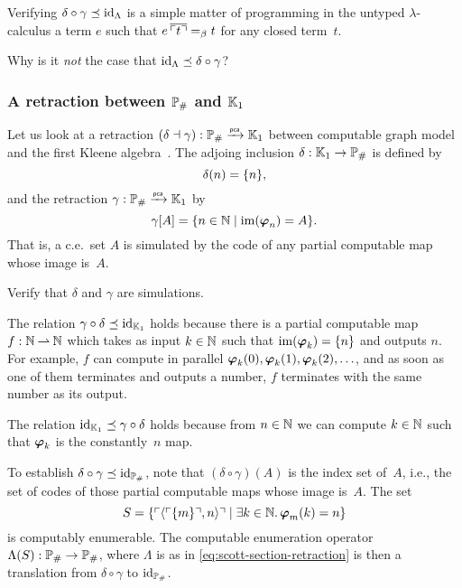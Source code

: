 Verifying $\delta \circ \gamma \preceq \id[\Lambda]$ is a simple matter of programming in the untyped $\lambda$-calculus a term $e$ such that $e \, \overline{\code{t}} =_\beta t$ for any closed term~$t$.

\begin{exercise}
  Why is it \emph{not} the case that $\id[\Lambda] \preceq \delta \circ \gamma$?
\end{exercise}


\subsubsection{A retraction between $\comp{\Scott}$ and $\klone$}
\label{ex:pcamorphism_K1_RE}%

%

Let us look at a retraction $(\delta \dashv \gamma): \comp{\Scott} \pcato \klone$ between computable graph model and the first Kleene algebra~\cite[Proposition 3.3.7]{Longley:94}.
%
The adjoing inclusion $\delta: \klone \to \comp{\Scott}$ is defined by
% 
\begin{equation*}
  \delta(n) = \set{n},
\end{equation*}
% 
and the retraction $\gamma: \comp{\Scott} \pcato \klone$ by
% 
\begin{equation*}
  \gamma[A] = \set{n \in \NN \such \im{\xpr_n} = A}.
\end{equation*}
%
That is, a c.e.~set $A$ is simulated by the code of any partial computable map whose image is~$A$.

\begin{exercise}
  Verify that $\delta$ and $\gamma$ are simulations.
\end{exercise}

The relation $\gamma \circ \delta \preceq \id[\klone]$ holds because there is a partial computable map~$f : \NN \parto \NN$ which takes as input $k \in \NN$ such that $\im{\xpr_k} = \set{n}$ and outputs $n$. For example, $f$ can compute in parallel $\pr{k}{0}, \pr{k}{1}, \pr{k}{2}, \ldots$, and as soon as one of them terminates and outputs a number, $f$ terminates with the same number as its output.

The relation $\id[\klone] \preceq \gamma \circ \delta$ holds because from $n \in \NN$ we can compute $k \in \NN$ such that $\xpr_k$ is the constantly~$n$ map.

To establish $\delta \circ \gamma \preceq \id[\comp{\Scott}]$, note that $(\delta \circ \gamma)(A)$ is the index set of~$A$, i.e., the set of codes of those partial computable maps whose image is~$A$. The set
%
\begin{equation*}
  S = \set{ \code{\pair{\code{\set{m}}, n}} \such \some{k \in \NN} \pr{m}{k} = n }
\end{equation*}
%
is computably enumerable. The computable enumeration operator $\Lambda(S) : \comp{\Scott} \to \comp{\Scott}$, where $\Lambda$ is as in \eqref{eq:scott-section-retraction} is then a translation from $\delta \circ \gamma$ to $\id[\comp{\Scott}]$.

